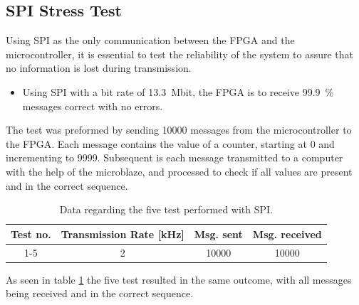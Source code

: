 \documentclass[../../main.tex]{subfiles}
\begin{document}
\subsection{SPI Stress Test}
Using SPI as the only communication between the FPGA and the microcontroller, it is essential to test the reliability of the system to assure that no information is lost during transmission. 
\begin{itemize}
    \item Using SPI with a bit rate of \SI{13,3}{\mega bit}, the FPGA is to receive \SI{99,9}{\percent} messages correct with no errors.
\end{itemize}
The test was preformed by sending 10000 messages from the microcontroller to the FPGA. Each message contains the value of a counter, starting at 0 and incrementing to 9999. Subsequent is each message transmitted to a computer with the help of the microblaze, and processed to check if all values are present and in the correct sequence.    
\begin{table}[H]
\centering
\begin{tabular}{c|c|c|c}
Test no. & Transmission Rate {[}kHz{]} & Msg. sent & Msg. received \\ \hline
1-5 & 2 & 10000 & 10000
\end{tabular}
\caption{Data regarding the five test performed with SPI.}
\label{tab:SPI-stresstest}
\end{table}

As seen in table \ref{tab:SPI-stresstest} the five test resulted in the same outcome, with all messages being received and in the correct sequence. 
\end{document}
